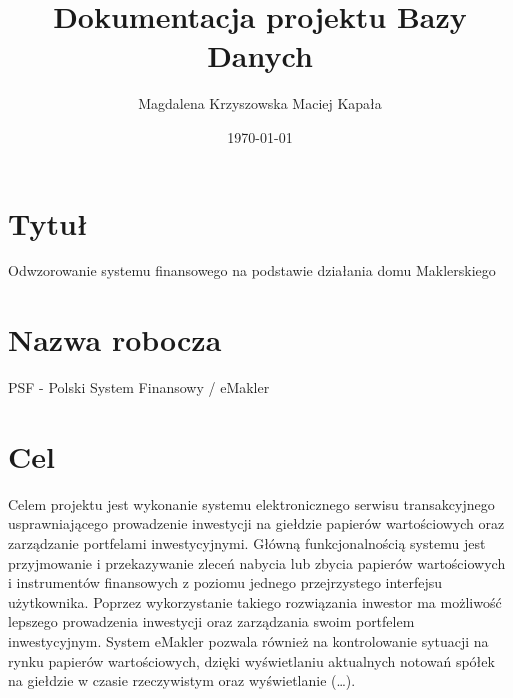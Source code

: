 \documentclass[12pt,a4paper]{article}
\begin{document}
\title{Dokumentacja projektu Bazy Danych}
\author{Magdalena Krzyszowska Maciej Kapała}
\date{\today}

\maketitle


\newpage

\tableofcontents
\listoftables
\listoffigures

\newpage

\section{Tytuł}

Odwzorowanie systemu finansowego na podstawie działania domu Maklerskiego

\section{Nazwa robocza}

PSF - Polski System Finansowy / eMakler

\section{Cel}

Celem projektu jest wykonanie systemu elektronicznego serwisu transakcyjnego usprawniającego prowadzenie inwestycji na giełdzie papierów wartościowych oraz zarządzanie portfelami inwestycyjnymi. Główną funkcjonalnością systemu jest przyjmowanie i przekazywanie zleceń nabycia lub zbycia papierów wartościowych i instrumentów finansowych z poziomu jednego przejrzystego interfejsu użytkownika. Poprzez wykorzystanie takiego rozwiązania inwestor ma możliwość lepszego prowadzenia inwestycji oraz zarządzania swoim portfelem inwestycyjnym. System eMakler pozwala również na kontrolowanie sytuacji na rynku papierów wartościowych, dzięki wyświetlaniu aktualnych notowań spółek na giełdzie w czasie rzeczywistym oraz wyświetlanie (…).

\newpage
\end{document}
